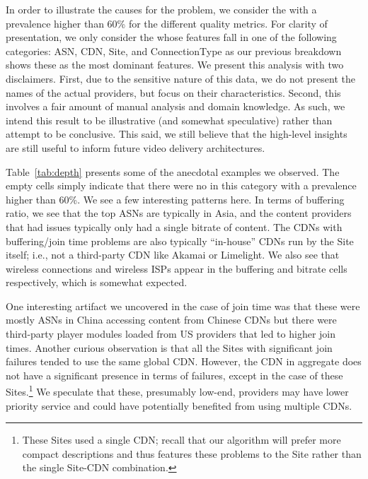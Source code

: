 

In order to illustrate the causes for the problem,  we 
consider the \criticalclusters with a prevalence higher 
than 60\% for the different quality metrics. 
For clarity of presentation, we only consider the 
\criticalclusters whose features fall in one of the following 
categories: ASN, CDN, Site, and ConnectionType as
our previous breakdown shows these as the most 
dominant features.  
We present this analysis with two disclaimers.  
First, due to the sensitive nature of this data, we do not 
present the names of the actual providers, but focus on their
characteristics.  
Second, this involves a fair amount of manual analysis and
domain knowledge. As such, we intend this result to be 
illustrative (and somewhat speculative) rather than attempt 
to be conclusive.  
This said, we still believe that the high-level insights are 
still useful to inform future video delivery architectures.

Table~\ref{tab:depth} presents some of the anecdotal 
examples we observed.  
The empty cells simply indicate that there were no 
\criticalclusters in this category with a prevalence higher 
than 60\%. 
We see a few interesting patterns here.  
In terms of buffering ratio, we see that the top ASNs are 
typically in Asia, and the content providers that had issues 
typically only had a single bitrate of content. 
The CDNs with buffering/join time problems are also
typically ``in-house'' CDNs run by the Site itself; i.e., 
not a third-party CDN like Akamai or Limelight.  
We also see that wireless connections and wireless
ISPs appear in the buffering and bitrate cells 
respectively, which is somewhat expected. 


One interesting artifact we uncovered in the case of 
join time was that these were mostly ASNs in China 
accessing content from Chinese CDNs but there were
third-party player modules loaded from US providers 
that led to higher join times. Another curious 
observation is that all the Sites with significant join
failures tended to use the same global CDN. 
However, the CDN in aggregate does not have a 
significant presence in terms of failures, except in the 
case of these Sites.\footnote{These Sites used a single 
CDN; recall that our \criticalcluster algorithm will 
prefer more compact descriptions and thus
features these problems to the Site rather than the 
single Site-CDN combination.} 
We speculate that these, presumably low-end, 
providers may have lower priority service and could 
have potentially benefited from using multiple CDNs.


